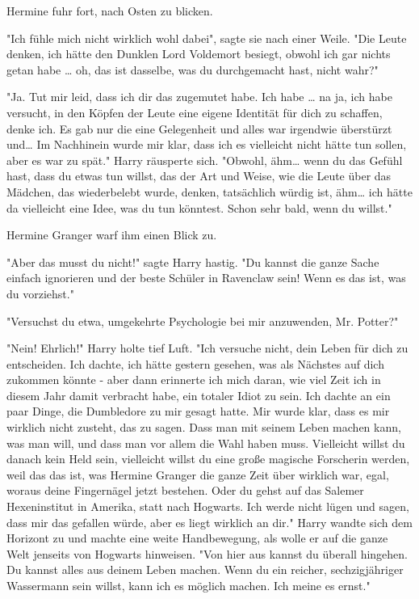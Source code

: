 {Hermine fuhr fort, nach Osten zu blicken.

"Ich fühle mich nicht wirklich wohl dabei", sagte sie nach einer Weile. "Die Leute denken, ich hätte den Dunklen Lord Voldemort besiegt, obwohl ich gar nichts getan habe … oh, das ist dasselbe, was du durchgemacht hast, nicht wahr?"

"Ja. Tut mir leid, dass ich dir das zugemutet habe. Ich habe … na ja, ich habe versucht, in den Köpfen der Leute eine eigene Identität für dich zu schaffen, denke ich. Es gab nur die eine Gelegenheit und alles war irgendwie überstürzt und… Im Nachhinein wurde mir klar, dass ich es vielleicht nicht hätte tun sollen, aber es war zu spät." Harry räusperte sich. "Obwohl, ähm… wenn du das Gefühl hast, dass du etwas tun willst, das der Art und Weise, wie die Leute über das Mädchen, das wiederbelebt wurde, denken, tatsächlich würdig ist, ähm… ich hätte da vielleicht eine Idee, was du tun könntest. Schon sehr bald, wenn du willst."

Hermine Granger warf ihm einen Blick zu.

"Aber das musst du nicht!" sagte Harry hastig. "Du kannst die ganze Sache einfach ignorieren und der beste Schüler in Ravenclaw sein! Wenn es das ist, was du vorziehst."

"Versuchst du etwa, umgekehrte Psychologie bei mir anzuwenden, Mr. Potter?"

"Nein! Ehrlich!" Harry holte tief Luft. "Ich versuche nicht, dein Leben für dich zu entscheiden. Ich dachte, ich hätte gestern gesehen, was als Nächstes auf dich zukommen könnte - aber dann erinnerte ich mich daran, wie viel Zeit ich in diesem Jahr damit verbracht habe, ein totaler Idiot zu sein. Ich dachte an ein paar Dinge, die Dumbledore zu mir gesagt hatte. Mir wurde klar, dass es mir wirklich nicht zusteht, das zu sagen. Dass man mit seinem Leben machen kann, was man will, und dass man vor allem die Wahl haben muss. Vielleicht willst du danach kein Held sein, vielleicht willst du eine große magische Forscherin werden, weil das das ist, was Hermine Granger die ganze Zeit über wirklich war, egal, woraus deine Fingernägel jetzt bestehen. Oder du gehst auf das Salemer Hexeninstitut in Amerika, statt nach Hogwarts. Ich werde nicht lügen und sagen, dass mir das gefallen würde, aber es liegt wirklich an dir." Harry wandte sich dem Horizont zu und machte eine weite Handbewegung, als wolle er auf die ganze Welt jenseits von Hogwarts hinweisen. "Von hier aus kannst du überall hingehen. Du kannst alles aus deinem Leben machen. Wenn du ein reicher, sechzigjähriger Wassermann sein willst, kann ich es möglich machen. Ich meine es ernst."

}
